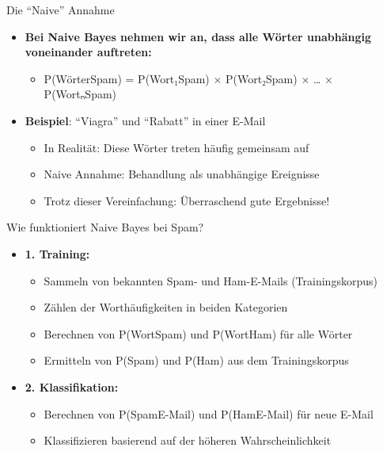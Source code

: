 \documentclass[
  ignorenonframetext,
]{beamer}
\providecommand{\tightlist}{%
  \setlength{\itemsep}{0pt}\setlength{\parskip}{0pt}}
\begin{document}
\begin{frame}{Die ``Naive'' Annahme}
\protect{}\label{die-naive-annahme}
\begin{itemize}
\tightlist
\item
  \textbf{Bei Naive Bayes nehmen wir an, dass alle Wörter unabhängig
  voneinander auftreten:}

  \begin{itemize}
  \tightlist
  \item
    P(Wörter\textbar Spam) = P(Wort₁\textbar Spam) ×
    P(Wort₂\textbar Spam) × \ldots{} × P(Wortₙ\textbar Spam)
  \end{itemize}
\item
  \textbf{Beispiel}: ``Viagra'' und ``Rabatt'' in einer E-Mail

  \begin{itemize}
  \tightlist
  \item
    In Realität: Diese Wörter treten häufig gemeinsam auf
  \item
    Naive Annahme: Behandlung als unabhängige Ereignisse
  \item
    Trotz dieser Vereinfachung: Überraschend gute Ergebnisse!
  \end{itemize}
\end{itemize}
\end{frame}

\begin{frame}{Wie funktioniert Naive Bayes bei Spam?}
\protect{}\label{wie-funktioniert-naive-bayes-bei-spam}
\begin{itemize}
\tightlist
\item
  \textbf{1. Training:}

  \begin{itemize}
  \tightlist
  \item
    Sammeln von bekannten Spam- und Ham-E-Mails (Trainingskorpus)
  \item
    Zählen der Worthäufigkeiten in beiden Kategorien
  \item
    Berechnen von P(Wort\textbar Spam) und P(Wort\textbar Ham) für alle
    Wörter
  \item
    Ermitteln von P(Spam) und P(Ham) aus dem Trainingskorpus
  \end{itemize}
\item
  \textbf{2. Klassifikation:}

  \begin{itemize}
  \tightlist
  \item
    Berechnen von P(Spam\textbar E-Mail) und P(Ham\textbar E-Mail) für
    neue E-Mail
  \item
    Klassifizieren basierend auf der höheren Wahrscheinlichkeit
  \end{itemize}
\end{itemize}
\end{frame}
\end{document}
